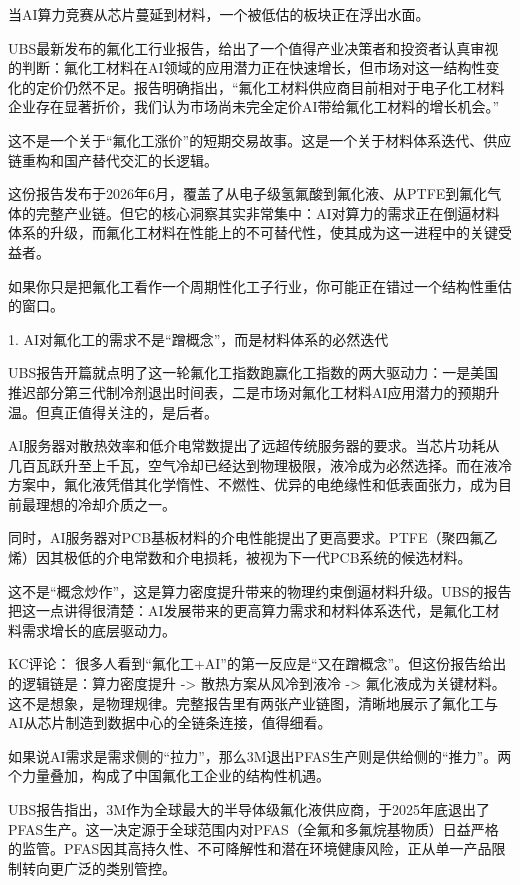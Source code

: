 \documentclass[11pt]{ctexart}
\begin{document}
当AI算力竞赛从芯片蔓延到材料，一个被低估的板块正在浮出水面。

UBS最新发布的氟化工行业报告，给出了一个值得产业决策者和投资者认真审视的判断：氟化工材料在AI领域的应用潜力正在快速增长，但市场对这一结构性变化的定价仍然不足。报告明确指出，“氟化工材料供应商目前相对于电子化工材料企业存在显著折价，我们认为市场尚未完全定价AI带给氟化工材料的增长机会。”

这不是一个关于“氟化工涨价”的短期交易故事。这是一个关于材料体系迭代、供应链重构和国产替代交汇的长逻辑。

这份报告发布于2026年6月，覆盖了从电子级氢氟酸到氟化液、从PTFE到氟化气体的完整产业链。但它的核心洞察其实非常集中：AI对算力的需求正在倒逼材料体系的升级，而氟化工材料在性能上的不可替代性，使其成为这一进程中的关键受益者。

如果你只是把氟化工看作一个周期性化工子行业，你可能正在错过一个结构性重估的窗口。

1. AI对氟化工的需求不是“蹭概念”，而是材料体系的必然迭代

UBS报告开篇就点明了这一轮氟化工指数跑赢化工指数的两大驱动力：一是美国推迟部分第三代制冷剂退出时间表，二是市场对氟化工材料AI应用潜力的预期升温。但真正值得关注的，是后者。

AI服务器对散热效率和低介电常数提出了远超传统服务器的要求。当芯片功耗从几百瓦跃升至上千瓦，空气冷却已经达到物理极限，液冷成为必然选择。而在液冷方案中，氟化液凭借其化学惰性、不燃性、优异的电绝缘性和低表面张力，成为目前最理想的冷却介质之一。

同时，AI服务器对PCB基板材料的介电性能提出了更高要求。PTFE（聚四氟乙烯）因其极低的介电常数和介电损耗，被视为下一代PCB系统的候选材料。

这不是“概念炒作”，这是算力密度提升带来的物理约束倒逼材料升级。UBS的报告把这一点讲得很清楚：AI发展带来的更高算力需求和材料体系迭代，是氟化工材料需求增长的底层驱动力。

KC评论： 很多人看到“氟化工+AI”的第一反应是“又在蹭概念”。但这份报告给出的逻辑链是：算力密度提升 -> 散热方案从风冷到液冷 -> 氟化液成为关键材料。这不是想象，是物理规律。完整报告里有两张产业链图，清晰地展示了氟化工与AI从芯片制造到数据中心的全链条连接，值得细看。

如果说AI需求是需求侧的“拉力”，那么3M退出PFAS生产则是供给侧的“推力”。两个力量叠加，构成了中国氟化工企业的结构性机遇。

UBS报告指出，3M作为全球最大的半导体级氟化液供应商，于2025年底退出了PFAS生产。这一决定源于全球范围内对PFAS（全氟和多氟烷基物质）日益严格的监管。PFAS因其高持久性、不可降解性和潜在环境健康风险，正从单一产品限制转向更广泛的类别管控。
\end{document}
